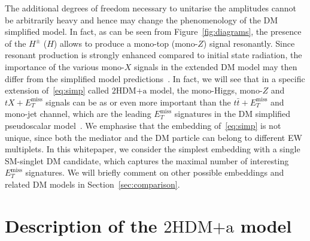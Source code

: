 \documentclass[a4paper, 11pt,notoc]{article}
\newcommand{\MET}{\ensuremath{E_T^\mathrm{miss}}\xspace}
\newcommand{\hdma}{\ensuremath{\textrm{2HDM+a}}\xspace}
\begin{document}
The additional degrees of freedom necessary to unitarise the amplitudes cannot be arbitrarily heavy and hence may change the phenomenology of the DM simplified model. In fact, as can be seen from Figure~\ref{fig:diagrams}, the presence of the $H^\pm$ ($H$) allows to produce a mono-top (mono-$Z$)  signal resonantly. Since resonant production is strongly enhanced compared to initial state radiation, the  importance of the various mono-$X$ signals in the extended DM model may then differ from the simplified model predictions~\cite{Goncalves:2016iyg,Bauer:2017ota,Pani:2017qyd}. In fact, we will see that in a specific extension of~\eqref{eq:simp}  called \hdma model, the mono-Higgs, mono-$Z$ and $t X + \MET$ signals can be as or even more important than the $t \bar t + \MET$ and mono-jet channel, which are  the leading $\MET$ signatures in the DM simplified pseudoscalar model~\cite{Haisch:2012kf,Fox:2012ru,Buckley:2014fba,Harris:2014hga,Haisch:2015ioa,Mattelaer:2015haa,Backovic:2015soa,Neubert:2015fka,Arina:2016cqj}. We emphasise that the embedding of~\eqref{eq:simp} is not unique, since  both the mediator and the DM particle can belong to different EW multiplets. In this whitepaper, we consider the simplest embedding with a single SM-singlet DM candidate, which captures the maximal number of interesting $\MET$ signatures. We will briefly comment on other possible embeddings and related DM models in Section~\ref{sec:comparison}.  


\section{Description of the \hdma model}
\label{sec:modeldescription}
\end{document}
